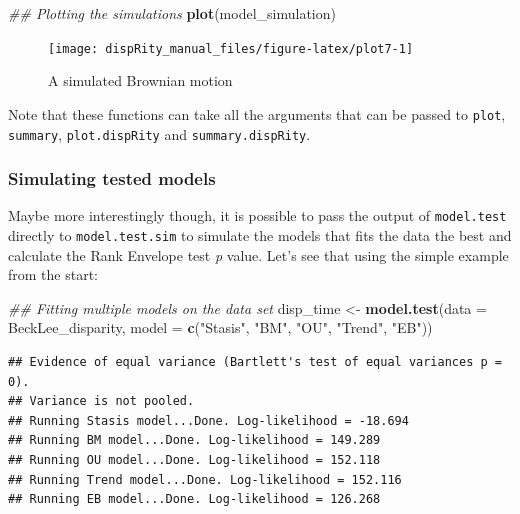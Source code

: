 \documentclass[
]{book}
\newenvironment{Shaded}{\begin{snugshade}}{\end{snugshade}}
\newcommand{\CommentTok}[1]{\textcolor[rgb]{0.56,0.35,0.01}{\textit{#1}}}
\newcommand{\DataTypeTok}[1]{\textcolor[rgb]{0.13,0.29,0.53}{#1}}
\newcommand{\KeywordTok}[1]{\textcolor[rgb]{0.13,0.29,0.53}{\textbf{#1}}}
\newcommand{\NormalTok}[1]{#1}
\newcommand{\StringTok}[1]{\textcolor[rgb]{0.31,0.60,0.02}{#1}}
\begin{document}
\begin{Shaded}
\begin{Highlighting}[]
\CommentTok{\#\# Plotting the simulations}
\KeywordTok{plot}\NormalTok{(model\_simulation)}
\end{Highlighting}
\end{Shaded}

\begin{figure}

{\centering \texttt{[image: dispRity\_manual\_files/figure-latex/plot7-1]} 

}

\caption{A simulated Brownian motion}\label{fig:plot7}
\end{figure}

Note that these functions can take all the arguments that can be passed to \texttt{plot}, \texttt{summary}, \texttt{plot.dispRity} and \texttt{summary.dispRity}.

\hypertarget{simulating-tested-models}{%
\subsubsection{Simulating tested models}\label{simulating-tested-models}}

Maybe more interestingly though, it is possible to pass the output of \texttt{model.test} directly to \texttt{model.test.sim} to simulate the models that fits the data the best and calculate the Rank Envelope test \emph{p} value.
Let's see that using the simple example from the start:

\begin{Shaded}
\begin{Highlighting}[]
\CommentTok{\#\# Fitting multiple models on the data set}
\NormalTok{disp\_time \textless{}{-}}\StringTok{ }\KeywordTok{model.test}\NormalTok{(}\DataTypeTok{data =}\NormalTok{ BeckLee\_disparity,}
                    \DataTypeTok{model =} \KeywordTok{c}\NormalTok{(}\StringTok{"Stasis"}\NormalTok{, }\StringTok{"BM"}\NormalTok{, }\StringTok{"OU"}\NormalTok{, }\StringTok{"Trend"}\NormalTok{, }\StringTok{"EB"}\NormalTok{))}
\end{Highlighting}
\end{Shaded}

\begin{verbatim}
## Evidence of equal variance (Bartlett's test of equal variances p = 0).
## Variance is not pooled.
## Running Stasis model...Done. Log-likelihood = -18.694
## Running BM model...Done. Log-likelihood = 149.289
## Running OU model...Done. Log-likelihood = 152.118
## Running Trend model...Done. Log-likelihood = 152.116
## Running EB model...Done. Log-likelihood = 126.268
\end{verbatim}
\end{document}
